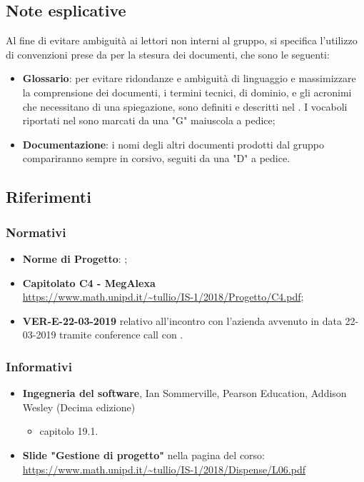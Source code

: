 \subsection{Note esplicative}
Al fine di evitare ambiguità ai lettori non interni al gruppo, si specifica l'utilizzo di convenzioni prese da \groupName{} per la stesura dei documenti, che sono le seguenti: 
\begin{itemize}
\item \textbf{Glossario}: per evitare ridondanze e ambiguità di linguaggio e massimizzare la comprensione dei documenti, i termini tecnici, di dominio, e gli acronimi  che necessitano di una spiegazione, sono  definiti e descritti nel \docNameVersionGlo{}. I vocaboli riportati nel \docNameVersionGlo{} sono marcati da una "G" maiuscola a pedice;
\item \textbf{Documentazione}: i nomi degli altri documenti prodotti dal gruppo \groupName{} compariranno sempre in corsivo, seguiti da una "D" a pedice.
\end{itemize}

\subsection{Riferimenti}

\subsubsection{Normativi}
\begin{itemize}
    \item \textbf{Norme di Progetto}: \docNameVersionNdP{};
    \item \textbf{Capitolato C4 - MegAlexa}\\ \url{https://www.math.unipd.it/~tullio/IS-1/2018/Progetto/C4.pdf};
    \item \textbf{VER-E-22-03-2019} relativo all'incontro con l'azienda \proposerName{} avvenuto in data 22-03-2019 tramite conference call con .
\end{itemize}

\subsubsection{Informativi}
\begin{itemize}
        \item \textbf{Ingegneria del software}, Ian Sommerville, Pearson Education, Addison Wesley (Decima edizione)
        \begin{itemize}
            \item capitolo 19.1.
        \end{itemize}
        \item \textbf{Slide "Gestione di progetto"} nella pagina del corso:\\ \url{https://www.math.unipd.it/~tullio/IS-1/2018/Dispense/L06.pdf}
\end{itemize}

